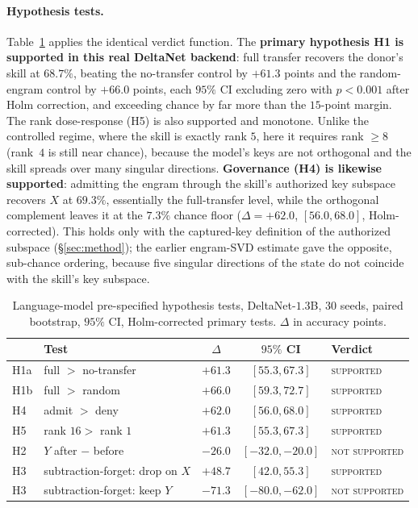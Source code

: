 \documentclass[11pt]{article}
\theoremstyle{definition}
\begin{document}
\paragraph{Hypothesis tests.}
Table~\ref{tab:lm-tests} applies the identical verdict function. The \textbf{primary hypothesis H1 is supported in this real DeltaNet backend}: full transfer recovers the donor's skill at $68.7\%$, beating the no-transfer control by $+61.3$ points and the random-engram control by $+66.0$ points, each $95\%$ CI excluding zero with $p<0.001$ after Holm correction, and exceeding chance by far more than the $15$-point margin. The rank dose-response (H5) is also supported and monotone. Unlike the controlled regime, where the skill is exactly rank $5$, here it requires rank $\ge 8$ (rank~$4$ is still near chance), because the model's keys are not orthogonal and the skill spreads over many singular directions. \textbf{Governance (H4) is likewise supported}: admitting the engram through the skill's authorized key subspace recovers $X$ at $69.3\%$, essentially the full-transfer level, while the orthogonal complement leaves it at the $7.3\%$ chance floor ($\Delta=+62.0$, $[56.0,68.0]$, Holm-corrected). This holds only with the captured-key definition of the authorized subspace (\S\ref{sec:method}); the earlier engram-SVD estimate gave the opposite, sub-chance ordering, because five singular directions of the state do not coincide with the skill's key subspace.

\begin{table}[h]
\centering
\caption{Language-model pre-specified hypothesis tests, DeltaNet-$1.3$B, $30$ seeds, paired bootstrap, $95\%$ CI, Holm-corrected primary tests. $\Delta$ in accuracy points.}
\label{tab:lm-tests}
\begin{tabular}{llccl}
\toprule
 & Test & $\Delta$ & $95\%$ CI & Verdict \\
\midrule
H1a & full $>$ no-transfer & $+61.3$ & $[55.3,67.3]$ & \textsc{supported} \\
H1b & full $>$ random & $+66.0$ & $[59.3,72.7]$ & \textsc{supported} \\
H4 & admit $>$ deny & $+62.0$ & $[56.0,68.0]$ & \textsc{supported} \\
H5 & rank $16 >$ rank $1$ & $+61.3$ & $[55.3,67.3]$ & \textsc{supported} \\
H2 & $Y$ after $-$ before & $-26.0$ & $[-32.0,-20.0]$ & \textsc{not supported} \\
H3 & subtraction-forget: drop on $X$ & $+48.7$ & $[42.0,55.3]$ & \textsc{supported} \\
H3 & subtraction-forget: keep $Y$ & $-71.3$ & $[-80.0,-62.0]$ & \textsc{not supported} \\
\bottomrule
\end{tabular}
\end{table}
\end{document}
